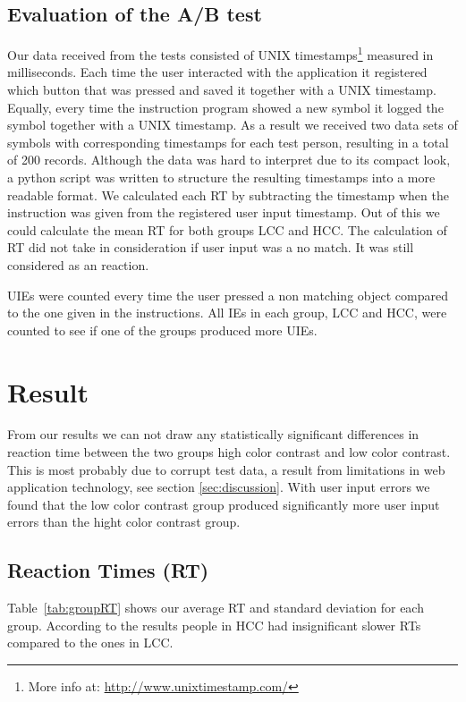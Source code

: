 \documentclass[runningheads,a4paper]{llncs}
\begin{document}
\subsection{Evaluation of the A/B test}
Our data received from the tests consisted of UNIX timestamps\footnote{More info at: \url{http://www.unixtimestamp.com/}} measured in milliseconds. Each time the user interacted with the application it registered which button that was pressed and saved it together with a UNIX timestamp. Equally, every time the instruction program showed a new symbol it logged the symbol together with a UNIX timestamp. As a result we received two data sets of symbols with corresponding timestamps for each test person, resulting in a total of 200 records. Although the data was hard to interpret due to its compact look, a python script was written to structure the resulting timestamps into a more readable format. We calculated each RT by subtracting the timestamp when the instruction was given from the registered user input timestamp. Out of this we could calculate the mean RT for both groups LCC and HCC. The calculation of RT did not take in consideration if user input was a no match. It was still considered as an reaction.

UIEs were counted every time the user pressed a non matching object compared to the one given in the instructions. All IEs in each group, LCC and HCC, were counted to see if one of the groups produced more UIEs.

\section{Result}
From our results we can not draw any statistically significant differences in reaction time between the two groups high color contrast and low color contrast. This is most probably due to corrupt test data, a result from limitations in web application technology, see section \ref{sec:discussion}. With user input errors we found that the low color contrast group produced significantly more user input errors than the hight color contrast group.

\subsection{Reaction Times (RT)}
Table~\ref{tab:groupRT} shows our average RT and standard deviation for each group. According to the results people in HCC had insignificant slower RTs compared to the ones in LCC.
\end{document}
